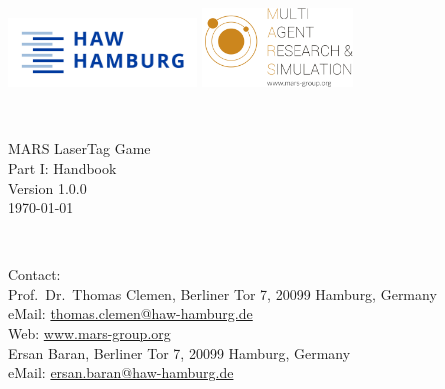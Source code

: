 \documentclass[a4paper,english,DIV=16,11pt,parskip=half,dvipsnames,listof=totoc,index=totoc,bibliography=totoc]{scrartcl}
\begin{document}
\begin{titlepage}

\begin{minipage}{\textwidth}
\noindent
\includegraphics[width=5cm]{./logos/HAW_Hamburg.jpeg}
\hfill
\includegraphics[width=4cm]{./logos/mars_logo.png}
\end{minipage}\\

\vspace{5cm}

\begin{minipage}{\textwidth}
\noindent
\centering
{\huge MARS LaserTag Game}\\[0.5cm]
{\LARGE Part I: Handbook}\\[0.5cm]
{\large \textsf{Version 1.0.0}}\\
{\large \textsf{\today}}

\end{minipage}\\


\vfill

\begin{framed}
	\begin{minipage}{\textwidth}
		Contact:\\[2ex]  
        Prof.~Dr.~Thomas Clemen, Berliner Tor 7, 20099 Hamburg, Germany\\
		eMail: \href{mailto:thomas.clemen@haw-hamburg.de}{thomas.clemen@haw-hamburg.de}\\
		Web: \url{www.mars-group.org}\\[2ex] 

        Ersan Baran, Berliner Tor 7, 20099 Hamburg, Germany\\
        eMail: \href{mailto:ersan.baran@haw-hamburg.de}{ersan.baran@haw-hamburg.de}\\
	\end{minipage}

\end{framed}

\end{titlepage}
\end{document}
